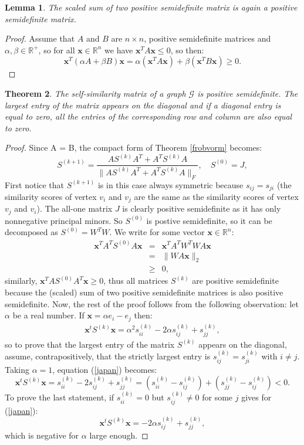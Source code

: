 \documentclass[a4paper,11pt]{report}
\newtheorem{theorem}{Theorem}[section]
\newtheorem{lemma}[theorem]{Lemma}
\newcommand{\R}{{\mathbb R}}
\newcommand{\graf}{\mathscr{G}}
\begin{document}
\begin{lemma}
  The scaled sum of two positive semidefinite matrix is again a positive semidefinite matrix.
\end{lemma}
\begin{proof}
  Assume that $A$ and $B$ are $n\times n$, positive semidefinite matrices and $\alpha, \beta \in \R^{+}$, so for all $\mathbf{x} \in 
  \R^n$ we have $\mathbf{x}^T A \mathbf{x} \leq 0$, so then:
  $$\mathbf{x}^T (\alpha A + \beta B) \mathbf{x} = \alpha (\mathbf{x}^T  A  \mathbf{x}) + \beta (\mathbf{x}^T B \mathbf{x}) 
  \geq 0.$$
\end{proof}
\begin{theorem}
  The self-similarity matrix of a graph $\graf$ is positive semidefinite. The largest entry of the matrix appears on the 
diagonal and if a diagonal entry is equal to zero,  all the entries of the corresponding row and 
column are also equal to zero.
\end{theorem}
\begin{proof}
  Since A = B, the compact form of Theorem \ref{frobvorm} becomes:
 $$S^{(k+1)} = \frac{AS^{(k)}A^T + A^TS^{(k)}A}{\|AS^{(k)}A^T + A^TS^{(k)}A\|_F}, \quad S^{(0)} = J,  $$
  First notice that $S^{(k+1)}$ is in this case always symmetric because $s_{ij} = s_{ji}$ (the similarity scores of vertex $v_i$ and $v_j$
  are the same as the similarity scores of vertex $v_j$ and $v_i$). The all-one matrix $J$ is clearly 
  positive semidefinite
  as it has only nonnegative principal minors. So $S^{(0)}$ is postive semidefinite, so it can be decomposed as 
  $S^{(0)} = W^T W$. We write for some vector $\mathbf{x} \in \R^n$:
  \begin{eqnarray*}
    \mathbf{x}^T A^T S^{(0)} A \mathbf{x} &=&  \mathbf{x}^T A^T W^T W A \mathbf{x}\\
    &=& \|W A \mathbf{x}\|_2\\
    & \geq & 0,
  \end{eqnarray*}  
  similarly, $\mathbf{x}^T A S^{(0)} A^T \mathbf{x} \geq 0$, thus all matrices $S^{(k)}$ 
  are positive semidefinite because the (scaled) sum of two positive 
  semidefinite matrices is also positive semidefinite. Now, the rest of the 
  proof follows from the following observation: let $\alpha$ be a real number. If 
  $\mathbf{x} = \alpha e_i - e_j$ then:
  \begin{eqnarray}\mathbf{x}^t S^{(k)} \mathbf{x} = \alpha^2 s^{(k)}_{ii} - 2\alpha s^{(k)}_{ij} 
  +  s^{(k)}_{jj}\label{japan},
  \end{eqnarray}
  so to prove that the largest entry of the matrix $S^{(k)}$ appears on the 
  diagonal, assume, contrapositively, that the strictly largest entry is $s^{(k)}_{ij} = s^{(k)}_{ji}$ with $i \not = j$. Taking 
  $\alpha = 1$, equation (\ref{japan}) becomes:
  $$\mathbf{x}^t S^{(k)} \mathbf{x} =  s^{(k)}_{ii} - 2 s^{(k)}_{ij} 
  +  s^{(k)}_{jj} = (s^{(k)}_{ii} - s^{(k)}_{ij}) + (s^{(k)}_{jj} - s^{(k)}_{ij}) 
  < 0.$$
  To prove the last statement,  if $s^{(k)}_{ii} = 0$ but $s^{(k)}_{ij} \not = 
  0$ for some $j$ gives for (\ref{japan}):
  $$\mathbf{x}^t S^{(k)} \mathbf{x} = - 2\alpha s^{(k)}_{ij} 
  +  s^{(k)}_{jj},$$
which is negative for $\alpha$ large enough. 
  
\end{proof}
\end{document}
